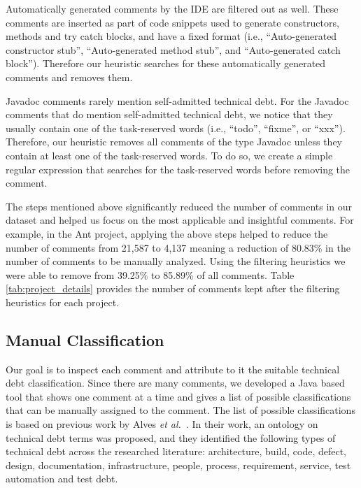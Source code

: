 Automatically generated comments by the IDE are filtered out as well. These comments are inserted as part of code snippets used to generate constructors, methods and try catch blocks, and have a fixed format (i.e., ``Auto-generated constructor stub'', ``Auto-generated method stub'', and ``Auto-generated catch block''). Therefore our heuristic searches for these automatically generated comments and removes them. 

Javadoc comments rarely mention self-admitted technical debt. For the Javadoc comments that do mention self-admitted technical debt, we notice that they usually contain one of the task-reserved words (i.e., ``todo'', ``fixme'', or ``xxx''). Therefore, our heuristic removes all comments of the type Javadoc unless they contain at least one of the task-reserved words. To do so, we create a simple regular expression that searches for the task-reserved words before removing the comment.  

The steps mentioned above significantly reduced the number of comments in our dataset and helped us focus on the most applicable and insightful comments. For example, in the Ant project, applying the above steps helped to reduce the number of comments from 21,587 to 4,137 meaning a reduction of 80.83\% in the number of comments to be manually analyzed. Using the filtering heuristics we were able to remove from 39.25\% to 85.89\% of all comments. Table \ref{tab:project_details} provides the number of comments kept after the filtering heuristics for each project.


\subsection{Manual Classification} %
\label{sub:manual_classification}

Our goal is to inspect each comment and attribute to it the suitable technical debt classification. Since there are many comments, we developed a Java based tool that shows one comment at a time and gives a list of possible classifications that can be manually assigned to the comment. The list of possible classifications is based on previous work by Alves \textit{et al.}~\cite{Alves2014MTD}. In their work, an ontology on technical debt terms was proposed, and they identified the following types of technical debt across the researched literature: architecture, build, code, defect, design, documentation, infrastructure, people, process, requirement, service, test automation and test debt. 

